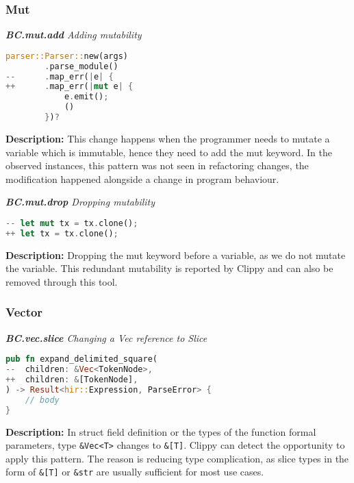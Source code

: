 \subsubsection{Mut}

\noindent \textit{ \textbf{BC.mut.add} Adding mutability}

\begin{lstlisting}[language=Rust, style=colouredRust]
parser::Parser::new(args)
        .parse_module()
--      .map_err(|e| {
++      .map_err(|mut e| {
            e.emit();
            ()
        })?
\end{lstlisting}

\noindent \textbf{Description:} This change happens when the programmer needs to mutate a variable which is immutable, hence they need to add the mut keyword. In the observed instances, this pattern was not seen in refactoring changes, the modification happened alongside a change in program behaviour.

\noindent \textit{ \textbf{BC.mut.drop} Dropping mutability}

\begin{lstlisting}[language=Rust, style=colouredRust]
-- let mut tx = tx.clone();
++ let tx = tx.clone();
\end{lstlisting}

\noindent \textbf{Description:} Dropping the mut keyword before a variable, as we do not mutate the variable. This redundant mutability is reported by Clippy and can also be removed through this tool.

\subsubsection{Vector}

\noindent \textit{ \textbf{BC.vec.slice} Changing a Vec reference to Slice}

\begin{lstlisting}[language=Rust, style=colouredRust]
pub fn expand_delimited_square(
--  children: &Vec<TokenNode>,
++  children: &[TokenNode],
) -> Result<hir::Expression, ParseError> {
    // body
}
\end{lstlisting}
\noindent \textbf{Description:} In struct field definition or the types of the function formal parameters, type \verb+&Vec<T>+ changes to \verb+&[T]+. Clippy can detect the opportunity to apply this pattern. The reason is reducing type complication, as slice types in the form of \verb+&[T]+ or \verb+&str+ are usually sufficient for most use cases. 

